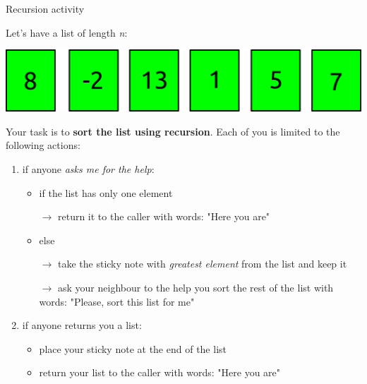 \begin{frame}{Recursion activity}

Let's have a list of length \emph{n}:

\begin{center}
\includegraphics[width=\textwidth]{frames_example.png}
\end{center}

Your task is to \textbf{sort the list using recursion}. Each of you is limited to the following actions:

\begin{enumerate}
\item if anyone \emph{asks me for the help}:
\begin{itemize}
	\item if the list has only one element

	$\rightarrow$ return it to the caller with words: "Here you are"

	\item else

	$\rightarrow$ take the sticky note with \emph{greatest element} from the list and keep it

	$\rightarrow$ ask your neighbour to the help you sort the rest of the list with words: "Please, sort this list for me"
\end{itemize}
\item if anyone returns you a list:
\begin{itemize}
	\item place your sticky note at the end of the list
	\item return your list to the caller with words: "Here you are"
\end{itemize}
\end{enumerate}

\end{frame}

